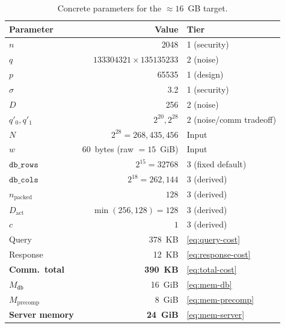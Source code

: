\documentclass[11pt,a4paper]{article}
\begin{document}
\begin{table}[ht]\centering
\caption{Concrete parameters for the $\approx\!16$~GB target.}\label{tab:concrete}
\begin{tabular}{@{}lrl@{}}
\toprule
\textbf{Parameter} & \textbf{Value} & \textbf{Tier} \\
\midrule
$n$                 & 2048                              & 1 (security) \\
$q$                 & $133304321 \times 135135233$       & 2 (noise) \\
$p$                 & 65535                              & 1 (design) \\
$\sigma$            & 3.2                                & 1 (security) \\
$D$                 & 256                                & 2 (noise) \\
$q'_0, q'_1$        & $2^{20}, 2^{28}$                  & 2 (noise/comm tradeoff) \\
\midrule
$N$                 & $2^{28} = 268{,}435{,}456$         & Input \\
$w$                 & 60~bytes (raw $= 15$~GiB)          & Input \\
$\texttt{db\_rows}$ & $2^{15} = 32768$                   & 3 (fixed default) \\
$\texttt{db\_cols}$ & $2^{18} = 262{,}144$               & 3 (derived) \\
$n_{\mathrm{packed}}$ & $128$                            & 3 (derived) \\
$D_{\mathrm{act}}$  & $\min(256, 128) = 128$             & 3 (derived) \\
$c$                 & $1$                                & 3 (derived) \\
\midrule
Query               & 378~KB                             & \eqref{eq:query-cost} \\
Response            & 12~KB                              & \eqref{eq:response-cost} \\
\textbf{Comm.\ total} & \textbf{390~KB}                  & \eqref{eq:total-cost} \\
\midrule
$M_{\texttt{db}}$        & 16~GiB                        & \eqref{eq:mem-db} \\
$M_{\mathrm{precomp}}$   & 8~GiB                         & \eqref{eq:mem-precomp} \\
\textbf{Server memory}   & \textbf{24~GiB}               & \eqref{eq:mem-server} \\
\bottomrule
\end{tabular}
\end{table}
\end{document}
